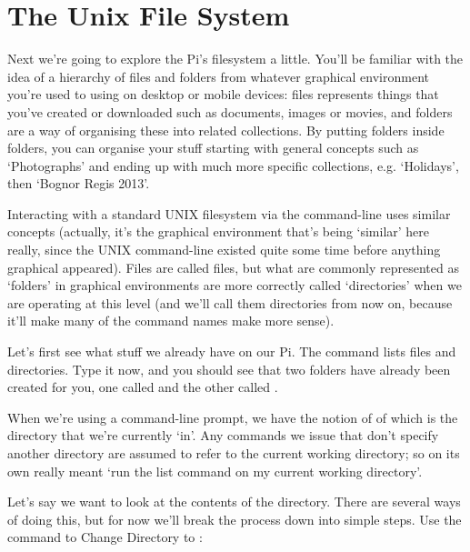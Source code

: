 \section{The Unix File System}

Next we're going to explore the Pi's filesystem a little. You'll be familiar with the idea of a hierarchy of files and folders from whatever graphical environment you're used to using on desktop or mobile devices: files represents things that you've created or downloaded such as documents, images or movies, and folders are a way of organising these into related collections. By putting folders inside folders, you can organise your stuff starting with general concepts such as `Photographs' and ending up with much more specific collections, e.g. `Holidays', then `Bognor Regis 2013'. 

Interacting with a standard UNIX filesystem via the command-line uses similar concepts (actually, it's the graphical environment that's being `similar' here really, since the UNIX command-line existed quite some time before anything graphical appeared). Files are called files, but what are commonly represented as `folders' in graphical environments are more correctly called `directories' when we are operating at this level (and we'll call them directories from now on, because it'll make many of the command names make more sense). 

Let's first see what stuff we already have on our Pi. The  command lists files and directories. Type it now, and you should see that two folders have already been created for you, one called  and the other called . 


When we're using a command-line prompt, we have the notion of of  which is the directory that we're currently `in'. Any commands we issue that don't specify another directory are assumed to refer to the current working directory; so  on its own really meant `run the list command on my current working directory'. 

Let's say we want to look at the contents of the  directory. There are several ways of doing this, but for now we'll break the process down into simple steps. Use the  command to Change Directory to :

